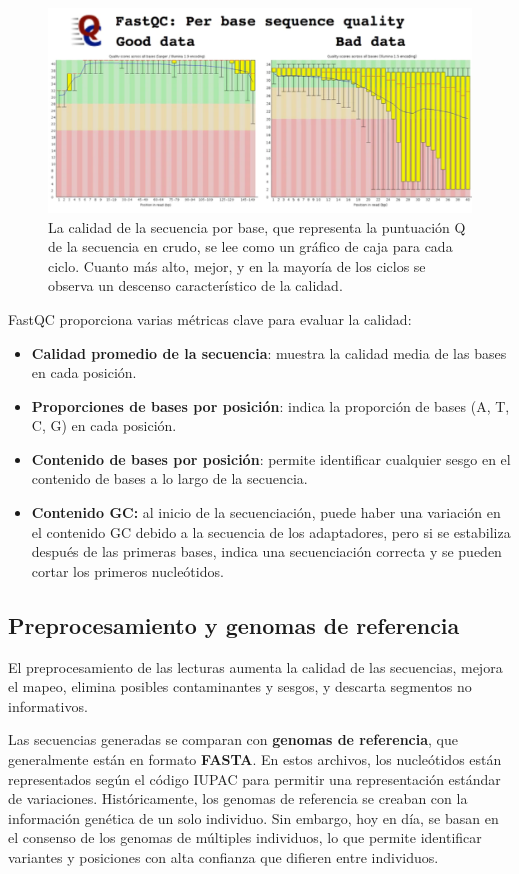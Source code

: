\begin{figure}[htbp]
\centering
\includegraphics[width = \textwidth]{figs/good-bad-fastq.png}
\caption{La calidad de la secuencia por base, que representa la puntuación Q de la secuencia en crudo, se lee como un gráfico de caja para cada ciclo. Cuanto más alto, mejor, y en la mayoría de los ciclos se observa un descenso característico de la calidad.}
\end{figure}

FastQC proporciona varias métricas clave para evaluar la calidad: 
\begin{itemize} 
\item \textbf{Calidad promedio de la secuencia}: muestra la calidad media de las bases en cada posición. 
\item \textbf{Proporciones de bases por posición}: indica la proporción de bases (A, T, C, G) en cada posición. 
\item \textbf{Contenido de bases por posición}: permite identificar cualquier sesgo en el contenido de bases a lo largo de la secuencia. 
\item \textbf{Contenido GC:} al inicio de la secuenciación, puede haber una variación en el contenido GC debido a la secuencia de los adaptadores, pero si se estabiliza después de las primeras bases, indica una secuenciación correcta y se pueden cortar los primeros nucleótidos. 
\end{itemize}

\subsection{Preprocesamiento y genomas de referencia} 
El preprocesamiento de las lecturas aumenta la calidad de las secuencias, mejora el mapeo, elimina posibles contaminantes y sesgos, y descarta segmentos no informativos.

Las secuencias generadas se comparan con \textbf{genomas de referencia}, que generalmente están en formato \textbf{FASTA}. En estos archivos, los nucleótidos están representados según el código IUPAC para permitir una representación estándar de variaciones. Históricamente, los genomas de referencia se creaban con la información genética de un solo individuo. Sin embargo, hoy en día, se basan en el consenso de los genomas de múltiples individuos, lo que permite identificar variantes y posiciones con alta confianza que difieren entre individuos.

